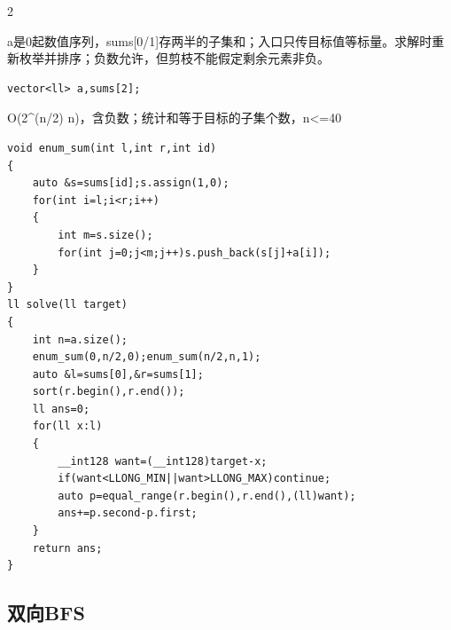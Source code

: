 \documentclass[UTF8,fontset=fandol,a4paper,twoside]{ctexart}
\newcommand{\note}[1]{{\fontsize{10}{12}\selectfont #1\par}}
\begin{document}
\begin{multicols}{2}
\note{a是0起数值序列，sums[\allowbreak{}0/\allowbreak{}1]\allowbreak{}存两半的子集和；入口只传目标值等标量。求解时重新枚举并排序；负数允许，但剪枝不能假定剩余元素非负。}
\begin{lstlisting}
vector<ll> a,sums[2];
\end{lstlisting}
\note{O(\allowbreak{}2\textasciicircum{}(\allowbreak{}n/\allowbreak{}2)\allowbreak{} n)\allowbreak{}，含负数；统计和等于目标的子集个数，n<\allowbreak{}=\allowbreak{}40}
\begin{lstlisting}
void enum_sum(int l,int r,int id)
{
    auto &s=sums[id];s.assign(1,0);
    for(int i=l;i<r;i++)
    {
        int m=s.size();
        for(int j=0;j<m;j++)s.push_back(s[j]+a[i]);
    }
}
ll solve(ll target)
{
    int n=a.size();
    enum_sum(0,n/2,0);enum_sum(n/2,n,1);
    auto &l=sums[0],&r=sums[1];
    sort(r.begin(),r.end());
    ll ans=0;
    for(ll x:l)
    {
        __int128 want=(__int128)target-x;
        if(want<LLONG_MIN||want>LLONG_MAX)continue;
        auto p=equal_range(r.begin(),r.end(),(ll)want);
        ans+=p.second-p.first;
    }
    return ans;
}
\end{lstlisting}
\subsection{双向BFS}


\end{multicols}
\end{document}
